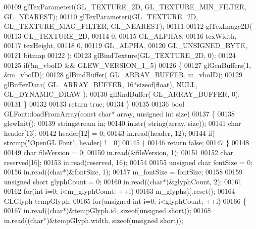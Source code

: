 \begin{DoxyCode}
00109     glTexParameteri(GL_TEXTURE_2D, GL_TEXTURE_MIN_FILTER, GL_NEAREST);
00110     glTexParameteri(GL_TEXTURE_2D, GL_TEXTURE_MAG_FILTER, GL_NEAREST);
00111 
00112     glTexImage2D(
00113         GL_TEXTURE_2D,
00114         0,
00115         GL_ALPHA8,
00116         texWidth,
00117         texHeight,
00118         0,
00119         GL_ALPHA,
00120         GL_UNSIGNED_BYTE,
00121         bitmap
00122     );
00123     glBindTexture(GL_TEXTURE_2D, 0);
00124 
00125     \textcolor{keywordflow}{if}(!m_vboID && GLEW_VERSION_1_5)
00126     \{
00127         glGenBuffers(1, &m_vboID);
00128         glBindBuffer( GL_ARRAY_BUFFER, m_vboID);
00129         glBufferData( GL_ARRAY_BUFFER, 16*\textcolor{keyword}{sizeof}(\textcolor{keywordtype}{float}), NULL, GL_DYNAMIC_DRAW );
00130         glBindBuffer( GL_ARRAY_BUFFER, 0);
00131     \}
00132 
00133     \textcolor{keywordflow}{return} \textcolor{keyword}{true};
00134 \}
00135 
00136 \textcolor{keywordtype}{bool} GLFont::loadFromArray(\textcolor{keyword}{const} \textcolor{keywordtype}{char}* array, \textcolor{keywordtype}{unsigned} \textcolor{keywordtype}{int} size)
00137 \{
00138     glewInit();
00139     stringstream in;
00140     in.str( \textcolor{keywordtype}{string}(array, size));
00141     \textcolor{keywordtype}{char} header[13];
00142     header[12] = 0;
00143     in.read(header, 12);
00144     \textcolor{keywordflow}{if}( strcmp(\textcolor{stringliteral}{"OpenGL Font"}, header) != 0)
00145     \{
00146         \textcolor{keywordflow}{return} \textcolor{keyword}{false};
00147     \}
00148 
00149     \textcolor{keywordtype}{char} fileVersion = 0;
00150     in.read(&fileVersion, 1);
00151 
00152     \textcolor{keywordtype}{char} reserved[16];
00153     in.read(reserved, 16);
00154 
00155     \textcolor{keywordtype}{unsigned} \textcolor{keywordtype}{char} fontSize = 0;
00156     in.read((\textcolor{keywordtype}{char}*)&fontSize, 1);
00157     m_fontSize = fontSize;
00158 
00159     \textcolor{keywordtype}{unsigned} \textcolor{keywordtype}{short} glyphCount = 0;
00160     in.read((\textcolor{keywordtype}{char}*)&glyphCount, 2);
00161 
00162     \textcolor{keywordflow}{for}(\textcolor{keywordtype}{int} i=0; i<m_glyphCount; ++i)
00163         m_glyphs[i].reset();
00164     GLGlyph tempGlyph;
00165     \textcolor{keywordflow}{for}(\textcolor{keywordtype}{unsigned} \textcolor{keywordtype}{int} i=0; i<glyphCount; ++i)
00166     \{
00167         in.read((\textcolor{keywordtype}{char}*)&tempGlyph.id, \textcolor{keyword}{sizeof}(\textcolor{keywordtype}{unsigned} \textcolor{keywordtype}{short}));
00168         in.read((\textcolor{keywordtype}{char}*)&tempGlyph.width, \textcolor{keyword}{sizeof}(\textcolor{keywordtype}{unsigned} \textcolor{keywordtype}{short}));

\end{DoxyCode}
